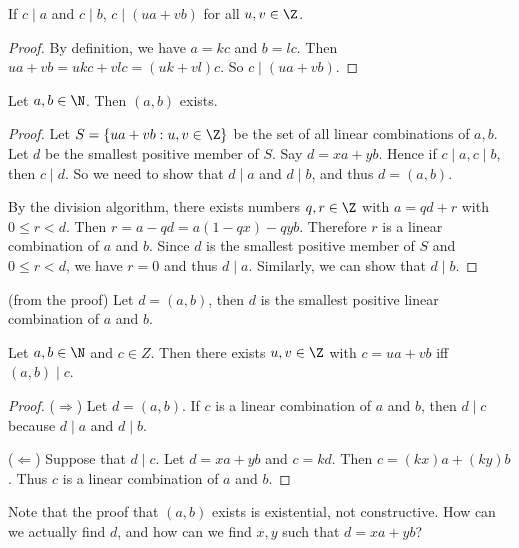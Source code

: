 \documentclass[a4paper]{article}
\begin{document}
\begin{prop}
  If $c\mid a$ and $c\mid b$, $c\mid (ua + vb)$ for all $u, v\in \Z$.
\end{prop}

\begin{proof}
  By definition, we have $a = kc$ and $b = lc$. Then $ua + vb = ukc + vlc = (uk + vl)c$. So $c\mid (ua + vb)$.
\end{proof}

\begin{thm}
  Let $a,b\in \N$. Then $(a, b)$ exists.
\end{thm}

\begin{proof}
  Let $S=\{ua + vb: u, v\in\Z\}$ be the set of all linear combinations of $a, b$. Let $d$ be the smallest positive member of $S$. Say $d = xa + yb$. Hence if $c\mid a, c\mid b$, then $c\mid d$. So we need to show that $d\mid a$ and $d\mid b$, and thus $d=(a, b)$.

  By the division algorithm, there exists numbers $q, r\in\Z$ with $a = qd + r$ with $0\leq r < d$. Then $r = a - qd = a(1 - qx) - qyb$. Therefore $r$ is a linear combination of $a$ and $b$. Since $d$ is the smallest positive member of $S$ and $0\leq r < d$, we have $r = 0$ and thus $d\mid a$. Similarly, we can show that $d\mid b$.
\end{proof}

\begin{cor}
  (from the proof) Let $d = (a, b)$, then $d$ is the smallest positive linear combination of $a$ and $b$.
\end{cor}

\begin{cor}
  Let $a, b\in\N$ and $c\in Z$. Then there exists $u, v\in \Z$ with $c=ua + vb$ iff $(a, b)\mid c$.
\end{cor}

\begin{proof}
  ($\Rightarrow$) Let $d=(a, b)$. If $c$ is a linear combination of $a$ and $b$, then $d\mid c$ because $d\mid a$ and $d\mid b$.

  ($\Leftarrow$) Suppose that $d\mid c$. Let $d = xa + yb$ and $c = kd$. Then $c = (kx)a + (ky)b$. Thus $c$ is a linear combination of $a$ and $b$.
\end{proof}

Note that the proof that $(a, b)$ exists is existential, not constructive. How can we actually find $d$, and how can we find $x, y$ such that $d = xa + yb$?
\end{document}
